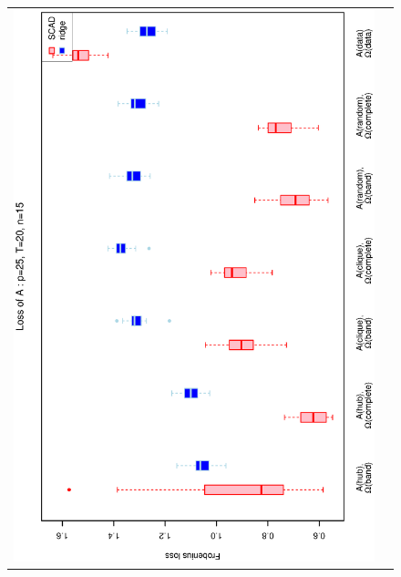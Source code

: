 \begin{figure}[h!]
\centering
\begin{tabular}{cc}
\includegraphics[scale=0.45,angle=270]{LossA25T20N15_5.eps}
\\

\end{tabular}
\end{figure}
